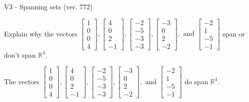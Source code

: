 \begin{exercise}
  \begin{exerciseTitle}V3 - Spanning sets (ver. 772)\end{exerciseTitle}
  \begin{exerciseStatement}
    Explain why the vectors \(\left[\begin{array}{r}
1 \\
0 \\
0 \\
4
\end{array}\right] , \left[\begin{array}{r}
4 \\
0 \\
2 \\
-1
\end{array}\right] , \left[\begin{array}{r}
-2 \\
-5 \\
-3 \\
-3
\end{array}\right] , \left[\begin{array}{r}
-3 \\
0 \\
2 \\
-2
\end{array}\right] , \text{ and } \left[\begin{array}{r}
-2 \\
1 \\
-5 \\
-1
\end{array}\right]\) span or don't span \(\mathbb{R}^4\). 
	


  \end{exerciseStatement}
  \begin{exerciseAnswer}
   The vectors \(\left[\begin{array}{r}
1 \\
0 \\
0 \\
4
\end{array}\right] , \left[\begin{array}{r}
4 \\
0 \\
2 \\
-1
\end{array}\right] , \left[\begin{array}{r}
-2 \\
-5 \\
-3 \\
-3
\end{array}\right] , \left[\begin{array}{r}
-3 \\
0 \\
2 \\
-2
\end{array}\right] , \text{ and } \left[\begin{array}{r}
-2 \\
1 \\
-5 \\
-1
\end{array}\right]\) 
  	 do  
	span \(\mathbb{R}^4\).
  



\end{exerciseAnswer}
\end{exercise}
